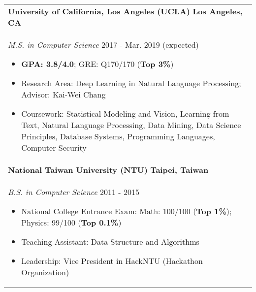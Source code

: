 \documentclass[letterpaper,11pt]{article} %
\begin{document}
{%
\begin{tabular}{p{18.5cm}}
{\bf{University of California, Los Angeles (UCLA)}}  \hfill \bf{Los Angeles, CA}\\
{\it M.S. in Computer Science} \hfill  2017 - Mar. 2019 (expected)
\begin{itemize}
\item \textbf{GPA: 3.8/4.0}; GRE: Q170/170 (\textbf{Top 3\%})
\item Research Area: Deep Learning in Natural Language Processing; Advisor: Kai-Wei Chang 
\item Coursework: Statistical Modeling and Vision, Learning from Text, Natural Language Processing, Data Mining, Data Science Principles, Database Systems, Programming Languages, Computer Security 
\vspace*{-\baselineskip}%
\end{itemize}\\ 
\vspace{.1mm}
%
{\bf{National Taiwan University (NTU)}} \hfill \bf{Taipei, Taiwan}\\
{\it B.S. in Computer Science} \hfill 2011 - 2015
\begin{itemize}
\item National College Entrance Exam:  Math: 100/100 (\textbf{Top 1\%}); Physics: 99/100 (\textbf{Top 0.1\%}) 
\item Teaching Assistant: Data Structure and Algorithms
\item Leadership: Vice President in HackNTU (Hackathon Organization)
\vspace*{-\baselineskip}
\end{itemize} 
\end{tabular}


}
\end{document}
